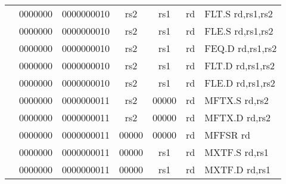\begin{table}[p]
\begin{small}
\begin{center}
\begin{tabular}{rcccccccccl}
&
\multicolumn{1}{|c|}{0000000} &
\multicolumn{5}{c|}{0000000010} &
\multicolumn{1}{c|}{rs2} &
\multicolumn{1}{c|}{rs1} &
\multicolumn{1}{c|}{rd} & FLT.S rd,rs1,rs2 \\
\cline{2-10}
  

&
\multicolumn{1}{|c|}{0000000} &
\multicolumn{5}{c|}{0000000010} &
\multicolumn{1}{c|}{rs2} &
\multicolumn{1}{c|}{rs1} &
\multicolumn{1}{c|}{rd} & FLE.S rd,rs1,rs2 \\
\cline{2-10}
  

&
\multicolumn{1}{|c|}{0000000} &
\multicolumn{5}{c|}{0000000010} &
\multicolumn{1}{c|}{rs2} &
\multicolumn{1}{c|}{rs1} &
\multicolumn{1}{c|}{rd} & FEQ.D rd,rs1,rs2 \\
\cline{2-10}
  

&
\multicolumn{1}{|c|}{0000000} &
\multicolumn{5}{c|}{0000000010} &
\multicolumn{1}{c|}{rs2} &
\multicolumn{1}{c|}{rs1} &
\multicolumn{1}{c|}{rd} & FLT.D rd,rs1,rs2 \\
\cline{2-10}
  

&
\multicolumn{1}{|c|}{0000000} &
\multicolumn{5}{c|}{0000000010} &
\multicolumn{1}{c|}{rs2} &
\multicolumn{1}{c|}{rs1} &
\multicolumn{1}{c|}{rd} & FLE.D rd,rs1,rs2 \\
\cline{2-10}
  

&
\multicolumn{1}{|c|}{0000000} &
\multicolumn{5}{c|}{0000000011} &
\multicolumn{1}{c|}{rs2} &
\multicolumn{1}{c|}{00000} &
\multicolumn{1}{c|}{rd} & MFTX.S rd,rs2 \\
\cline{2-10}
  

&
\multicolumn{1}{|c|}{0000000} &
\multicolumn{5}{c|}{0000000011} &
\multicolumn{1}{c|}{rs2} &
\multicolumn{1}{c|}{00000} &
\multicolumn{1}{c|}{rd} & MFTX.D rd,rs2 \\
\cline{2-10}
  

&
\multicolumn{1}{|c|}{0000000} &
\multicolumn{5}{c|}{0000000011} &
\multicolumn{1}{c|}{00000} &
\multicolumn{1}{c|}{00000} &
\multicolumn{1}{c|}{rd} & MFFSR rd \\
\cline{2-10}
  

&
\multicolumn{1}{|c|}{0000000} &
\multicolumn{5}{c|}{0000000011} &
\multicolumn{1}{c|}{00000} &
\multicolumn{1}{c|}{rs1} &
\multicolumn{1}{c|}{rd} & MXTF.S rd,rs1 \\
\cline{2-10}
  

&
\multicolumn{1}{|c|}{0000000} &
\multicolumn{5}{c|}{0000000011} &
\multicolumn{1}{c|}{00000} &
\multicolumn{1}{c|}{rs1} &
\multicolumn{1}{c|}{rd} & MXTF.D rd,rs1 \\
\cline{2-10}
  


\end{tabular}
\end{center}
\end{small}
\end{table}
